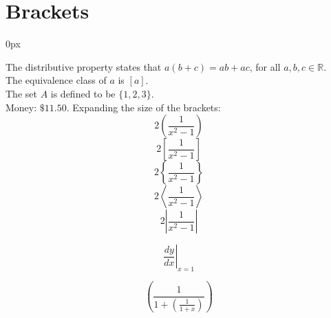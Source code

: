 \maketitle
\section{Brackets}

\parindent 0px

The distributive property states that $a(b+c)=ab+ac$, for all $a, b, c \in \mathbb{R}$. \\[6pt]
The equivalence class of $a$ is $[a]$.\\[6pt]
The set $A$ is defined to be $\{1, 2, 3\}$.\\[6pt]
Money:  $\$11.50$. 
Expanding the size of the brackets: 
$$2\left(\frac{1}{x^2-1}\right)$$
$$2\left[\frac{1}{x^2-1}\right]$$
$$2\left\{\frac{1}{x^2-1}\right\}$$
$$2\left \langle      \frac{1}{x^2-1}\right \rangle      $$
$$2\left | \frac{1}{x^2-1}\right |      $$

$$\left.\frac{dy}{dx}\right|_{x=1}$$

$$\left( \frac{1}{1+\left(\frac{1}{1+x}\right)} \right)$$




